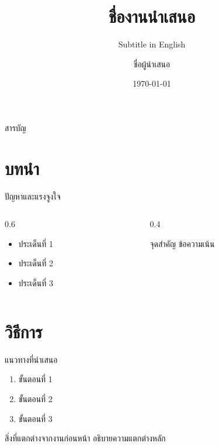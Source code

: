\documentclass[aspectratio=169,10pt]{beamer}
\title{\textbf{ชื่องานนำเสนอ}}
\subtitle{Subtitle in English}
\author{ชื่อผู้นำเสนอ}
\institute{มหาวิทยาลัย · ภาควิชา}
\date{\today}
\begin{document}
\begin{frame}
  \titlepage
\end{frame}

\begin{frame}{สารบัญ}
  \tableofcontents
\end{frame}

\section{บทนำ}

\begin{frame}{ปัญหาและแรงจูงใจ}
  \begin{columns}
    \begin{column}{0.6\textwidth}
      \begin{itemize}
        \item ประเด็นที่ 1
        \item ประเด็นที่ 2
        \item ประเด็นที่ 3
      \end{itemize}
    \end{column}
    \begin{column}{0.4\textwidth}
      \begin{block}{จุดสำคัญ}
        ข้อความเน้น
      \end{block}
    \end{column}
  \end{columns}
\end{frame}

\section{วิธีการ}

\begin{frame}{แนวทางที่นำเสนอ}
  \begin{enumerate}
    \item ขั้นตอนที่ 1
    \item ขั้นตอนที่ 2
    \item ขั้นตอนที่ 3
  \end{enumerate}

  \vspace{12pt}
  \begin{alertblock}{สิ่งที่แตกต่างจากงานก่อนหน้า}
    อธิบายความแตกต่างหลัก
  \end{alertblock}
\end{frame}
\end{document}
